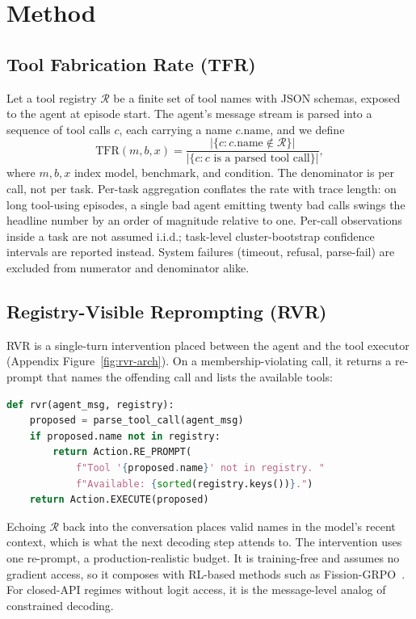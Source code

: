 \section{Method}
\label{sec:method}

\subsection{Tool Fabrication Rate (TFR)}
\label{sec:method:tfr}

Let a tool registry $\mathcal{R}$ be a finite set of tool names with JSON schemas, exposed to the agent at episode start. The agent's message stream is parsed into a sequence of tool calls $c$, each carrying a name $c.\mathrm{name}$, and we define
\[
\mathrm{TFR}(m, b, x) = \frac{|\{c : c.\mathrm{name}\notin \mathcal{R}\}|}{|\{c : c \text{ is a parsed tool call}\}|},
\]
where $m, b, x$ index model, benchmark, and condition. The denominator is per call, not per task. Per-task aggregation conflates the rate with trace length: on long tool-using episodes, a single bad agent emitting twenty bad calls swings the headline number by an order of magnitude relative to one. Per-call observations inside a task are not assumed i.i.d.; task-level cluster-bootstrap confidence intervals are reported instead. System failures (timeout, refusal, parse-fail) are excluded from numerator and denominator alike.

\subsection{Registry-Visible Reprompting (RVR)}
\label{sec:method:rvr}

RVR is a single-turn intervention placed between the agent and the tool executor (Appendix Figure~\ref{fig:rvr-arch}). On a membership-violating call, it returns a re-prompt that names the offending call and lists the available tools:

\begin{lstlisting}[language=Python,basicstyle=\ttfamily\footnotesize]
def rvr(agent_msg, registry):
    proposed = parse_tool_call(agent_msg)
    if proposed.name not in registry:
        return Action.RE_PROMPT(
            f"Tool '{proposed.name}' not in registry. "
            f"Available: {sorted(registry.keys())}.")
    return Action.EXECUTE(proposed)
\end{lstlisting}

Echoing $\mathcal{R}$ back into the conversation places valid names in the model's recent context, which is what the next decoding step attends to. The intervention uses one re-prompt, a production-realistic budget. It is training-free and assumes no gradient access, so it composes with RL-based methods such as Fission-GRPO~\citep{fissiongrpo2026}. For closed-API regimes without logit access, it is the message-level analog of constrained decoding.

